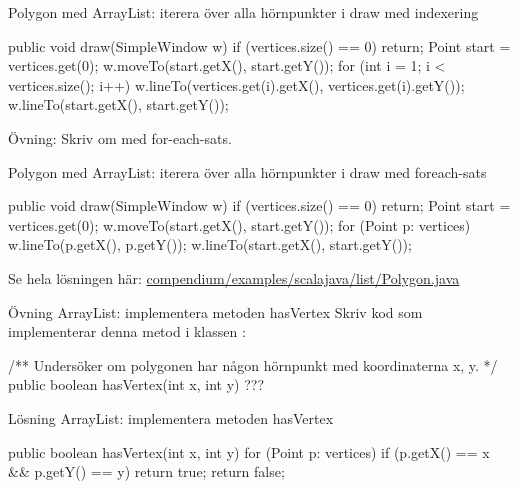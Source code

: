 \begin{Slide}{Polygon med ArrayList: iterera över alla hörnpunkter i draw med indexering}
\begin{Code}[numberstyle=,language=Java]
    public void draw(SimpleWindow w) {
        if (vertices.size() == 0) {
            return;
        }
        Point start = vertices.get(0);
        w.moveTo(start.getX(), start.getY());
        for (int i = 1; i < vertices.size(); i++) {
            w.lineTo(vertices.get(i).getX(),
                     vertices.get(i).getY());
        }
        w.lineTo(start.getX(), start.getY());
    }
\end{Code}

Övning: Skriv om med for-each-sats.
\end{Slide}

\begin{Slide}{Polygon med ArrayList: iterera över alla hörnpunkter i draw med foreach-sats}
\begin{Code}[numberstyle=,language=Java]
    public void draw(SimpleWindow w) {
        if (vertices.size() == 0) {
            return;
        }
        Point start = vertices.get(0);
        w.moveTo(start.getX(), start.getY());
        for (Point p: vertices){
            w.lineTo(p.getX(), p.getY());
        }
        w.lineTo(start.getX(), start.getY());
    }
\end{Code}

Se hela lösningen här:
\href{https://github.com/lunduniversity/introprog/tree/master/compendium/examples/scalajava/list/Polygon.java}{compendium/examples/scalajava/list/Polygon.java}
\end{Slide}




\begin{Slide}{Övning ArrayList: implementera metoden hasVertex}
Skriv kod som implementerar denna metod i klassen :
\begin{Code}[numberstyle=,language=Java]
/** Undersöker om polygonen har någon hörnpunkt med koordinaterna x, y. */
public boolean hasVertex(int x, int y) {
    ???
}
\end{Code}
\end{Slide}

\begin{Slide}{Lösning ArrayList: implementera metoden hasVertex}
\begin{Code}[numberstyle=,language=Java]
    public boolean hasVertex(int x, int y) {
        for (Point p: vertices) {
            if (p.getX() == x && p.getY() == y) {
                return true;
            }
        }
        return false;
    }
\end{Code}
\end{Slide}


